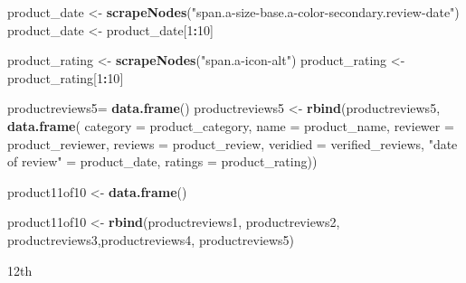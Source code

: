 \documentclass[
]{article}
\newenvironment{Shaded}{\begin{snugshade}}{\end{snugshade}}
\newcommand{\AttributeTok}[1]{\textcolor[rgb]{0.13,0.29,0.53}{#1}}
\newcommand{\DecValTok}[1]{\textcolor[rgb]{0.00,0.00,0.81}{#1}}
\newcommand{\FunctionTok}[1]{\textcolor[rgb]{0.13,0.29,0.53}{\textbf{#1}}}
\newcommand{\NormalTok}[1]{#1}
\newcommand{\OtherTok}[1]{\textcolor[rgb]{0.56,0.35,0.01}{#1}}
\newcommand{\SpecialCharTok}[1]{\textcolor[rgb]{0.81,0.36,0.00}{\textbf{#1}}}
\newcommand{\StringTok}[1]{\textcolor[rgb]{0.31,0.60,0.02}{#1}}
\begin{document}
\begin{Shaded}
\begin{Highlighting}[]
\NormalTok{  product\_date }\OtherTok{\textless{}{-}} \FunctionTok{scrapeNodes}\NormalTok{(}\StringTok{"span.a{-}size{-}base.a{-}color{-}secondary.review{-}date"}\NormalTok{)}
\NormalTok{  product\_date }\OtherTok{\textless{}{-}}\NormalTok{ product\_date[}\DecValTok{1}\SpecialCharTok{:}\DecValTok{10}\NormalTok{]}
  
\NormalTok{  product\_rating }\OtherTok{\textless{}{-}} \FunctionTok{scrapeNodes}\NormalTok{(}\StringTok{"span.a{-}icon{-}alt"}\NormalTok{)}
\NormalTok{  product\_rating }\OtherTok{\textless{}{-}}\NormalTok{ product\_rating[}\DecValTok{1}\SpecialCharTok{:}\DecValTok{10}\NormalTok{]}
  
\NormalTok{  productreviews5}\OtherTok{=} \FunctionTok{data.frame}\NormalTok{()}
\NormalTok{  productreviews5 }\OtherTok{\textless{}{-}} \FunctionTok{rbind}\NormalTok{(productreviews5, }\FunctionTok{data.frame}\NormalTok{(}
                      \AttributeTok{category =}\NormalTok{ product\_category,}
                      \AttributeTok{name =}\NormalTok{ product\_name,}
                      \AttributeTok{reviewer =}\NormalTok{ product\_reviewer,}
                      \AttributeTok{reviews =}\NormalTok{ product\_review,}
                      \AttributeTok{veridied =}\NormalTok{ verified\_reviews,}
                      \StringTok{"date of review"} \OtherTok{=}\NormalTok{ product\_date,}
                      \AttributeTok{ratings =}\NormalTok{ product\_rating))}
  
\NormalTok{  product11of10 }\OtherTok{\textless{}{-}} \FunctionTok{data.frame}\NormalTok{()}
  
\NormalTok{  product11of10 }\OtherTok{\textless{}{-}} \FunctionTok{rbind}\NormalTok{(productreviews1, productreviews2, productreviews3,productreviews4, productreviews5)}
\end{Highlighting}
\end{Shaded}

12th
\end{document}
